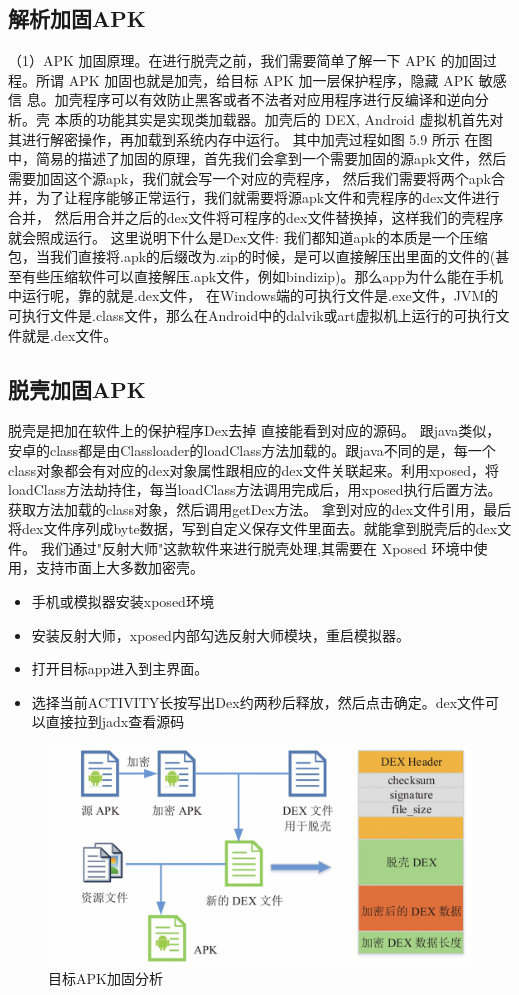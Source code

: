 \subsection*{解析加固APK}
（1）APK 加固原理。在进行脱壳之前，我们需要简单了解一下 APK 的加固过
程。所谓 APK 加固也就是加壳，给目标 APK 加一层保护程序，隐藏 APK 敏感信
息。加壳程序可以有效防止黑客或者不法者对应用程序进行反编译和逆向分析。壳
本质的功能其实是实现类加载器。加壳后的 DEX, Android 虚拟机首先对其进行解密操作，再加载到系统内存中运行。
其中加壳过程如图 5.9 所示
在图中，简易的描述了加固的原理，首先我们会拿到一个需要加固的源apk文件，然后需要加固这个源apk，我们就会写一个对应的壳程序，
然后我们需要将两个apk合并，为了让程序能够正常运行，我们就需要将源apk文件和壳程序的dex文件进行合并，
然后用合并之后的dex文件将可程序的dex文件替换掉，这样我们的壳程序就会照成运行。
这里说明下什么是Dex文件:
我们都知道apk的本质是一个压缩包，当我们直接将.apk的后缀改为.zip的时候，是可以直接解压出里面的文件的(甚至有些压缩软件可以直接解压.apk文件，例如bindizip)。那么app为什么能在手机中运行呢，靠的就是.dex文件，
在Windows端的可执行文件是.exe文件，JVM的可执行文件是.class文件，那么在Android中的dalvik或art虚拟机上运行的可执行文件就是.dex文件。
\subsection*{脱壳加固APK}
脱壳是把加在软件上的保护程序Dex去掉 直接能看到对应的源码。
跟java类似，安卓的class都是由Classloader的loadClass方法加载的。跟java不同的是，每一个class对象都会有对应的dex对象属性跟相应的dex文件关联起来。利用xposed，将loadClass方法劫持住，每当loadClass方法调用完成后，用xposed执行后置方法。获取方法加载的class对象，然后调用getDex方法。
拿到对应的dex文件引用，最后将dex文件序列成byte数据，写到自定义保存文件里面去。就能拿到脱壳后的dex文件。
我们通过"反射大师"这款软件来进行脱壳处理,其需要在 Xposed 环境中使用，支持市面上大多数加密壳。
\begin{itemize}
  \item 手机或模拟器安装xposed环境
  \item 安装反射大师，xposed内部勾选反射大师模块，重启模拟器。
  \item 打开目标app进入到主界面。
  \item 选择当前ACTIVITY长按写出Dex约两秒后释放，然后点击确定。dex文件可以直接拉到jadx查看源码
\end{itemize}

\begin{figure}
  \centering
  \includegraphics[scale=0.5]{resources/img/i24.png}
  \caption{目标APK加固分析}
\end{figure}

